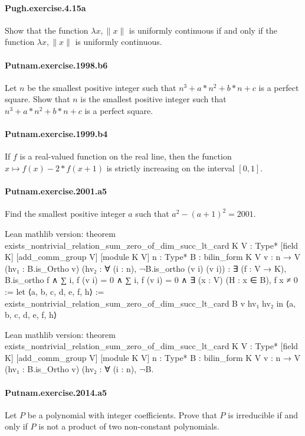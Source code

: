 \documentclass{article}
\begin{document}
\paragraph{Pugh.exercise.4.15a} Show that the
  function $λ x, ∥x∥$ is uniformly continuous if and only if the function $λ x,
  ∥x∥$ is uniformly continuous.

\paragraph{Putnam.exercise.1998.b6} Let $n$ be the smallest positive integer such that $n^3 + a*n^2 + b*n + c$ is a perfect square. Show that $n$ is the smallest positive integer such that $n^3 + a*n^2 + b*n + c$ is a perfect square.

\paragraph{Putnam.exercise.1999.b4} If $f$ is a real-valued function on the real line, then the function $x \mapsto f(x) - 2 * f(x + 1)$ is strictly increasing on the interval $[0, 1]$.

\paragraph{Putnam.exercise.2001.a5} Find the smallest positive integer $a$ such that $a^2 - (a+1)^2 = 2001$.

Lean mathlib version:
theorem exists_nontrivial_relation_sum_zero_of_dim_succ_lt_card {K V : Type*} [field K] 
  [add_comm_group V] [module K V] {n : Type*} {B : bilin_form K V} 
  {v : n → V} (hv₁ : B.is_Ortho v) (hv₂ : ∀ (i : n), ¬B.is_ortho (v i) (v i)) :
  ∃ (f : V → K), B.is_ortho f ∧ ∑ i, f (v i) = 0 ∧ ∑ i, f (v i) = 0 ∧ ∃ (x : V) (H : x ∈ B), f x ≠ 0 :=
let ⟨a, b, c, d, e, f, h⟩ := exists_nontrivial_relation_sum_zero_of_dim_succ_lt_card B v hv₁ hv₂ in
⟨a, b, c, d, e, f, h⟩

Lean mathlib version:
theorem exists_nontrivial_relation_sum_zero_of_dim_succ_lt_card {K V : Type*} [field K] 
  [add_comm_group V] [module K V] {n : Type*} {B : bilin_form K V} 
  {v : n → V} (hv₁ : B.is_Ortho v) (hv₂ : ∀ (i : n), ¬B.

\paragraph{Putnam.exercise.2014.a5} Let $P$ be a polynomial with integer coefficients. Prove that $P$ is irreducible if and only if $P$ is not a product of two non-constant polynomials.
\end{document}
